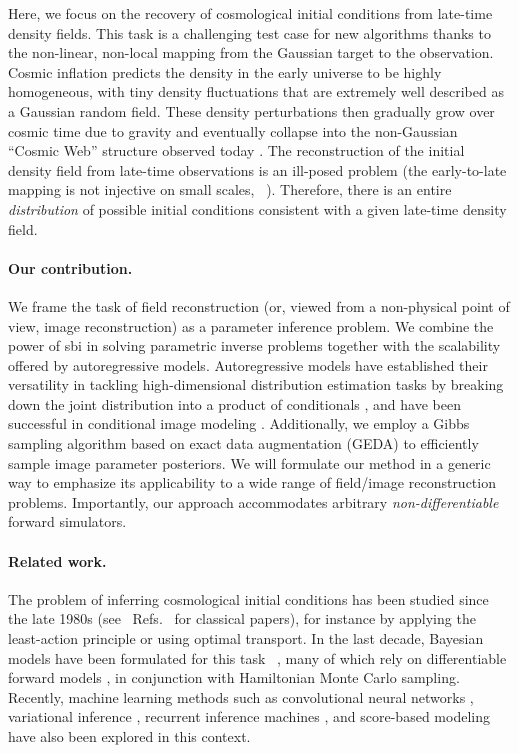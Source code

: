 Here, we focus on the recovery of cosmological initial conditions from late-time density fields. This task is a challenging test case for new algorithms thanks to the non-linear, non-local mapping from the Gaussian target to the observation.  Cosmic inflation predicts the density in the early universe to be highly homogeneous, with tiny density fluctuations that are extremely well described as a Gaussian random field. These density perturbations then gradually grow over cosmic time due to gravity and eventually collapse into the non-Gaussian ``Cosmic Web'' structure observed today \cite{Bond:1995yt}. 
The reconstruction of the initial density field from late-time observations is an ill-posed problem (the early-to-late mapping is not injective on small scales, ~\cite[\eg,][]{Brenier:2003xs}). Therefore, there is an entire {\it distribution} of possible initial conditions consistent with a given late-time density field. 

\paragraph{Our contribution.}  We frame the task of field reconstruction (or, viewed from a non-physical point of view, image reconstruction) as a parameter inference problem.  We combine the power of \gls*{sbi} in solving parametric inverse problems together with the scalability offered by autoregressive models. Autoregressive models have established their versatility in tackling high-dimensional distribution estimation tasks by breaking down the joint distribution into a product of conditionals \cite{Papamakarios:2017tec, Uria:2016aa}, and have been successful in conditional image modeling \cite{van:2016pixel}. Additionally, we employ a Gibbs sampling algorithm based on exact data augmentation (GEDA) \cite{Marnissi:2019aa} to efficiently sample image parameter posteriors.
We will formulate our method in a generic way to emphasize its applicability to a wide range of field/image reconstruction problems. Importantly, our approach accommodates arbitrary \textit{non-differentiable} forward simulators.

\paragraph{Related work.} The problem of inferring cosmological initial conditions has been studied since the late 1980s (see \eg~Refs.~\cite{Croft:1996jw, Frisch:2001vw, Gramann:1993aa, Nusser:1992aa, Peebles:2020aa, Weinberg:1992aa} for classical papers), for instance by applying the least-action principle or using optimal transport. In the last decade, Bayesian models have been formulated for this task ~\cite[\eg,][]{Jasche:2012kq}, many of which rely on differentiable forward models \cite{Li:2022bsu, Modi:2020dyb}, in conjunction with Hamiltonian Monte Carlo sampling. 
Recently, machine learning methods such as convolutional neural networks \cite{Shallue:2022mhf, Chen:2023uup}, variational inference \cite{Modi:2022pzm}, recurrent inference machines \cite{Modi:2021acq}, and score-based modeling \cite{Legin:2023jxc} have also been explored in this context. 


